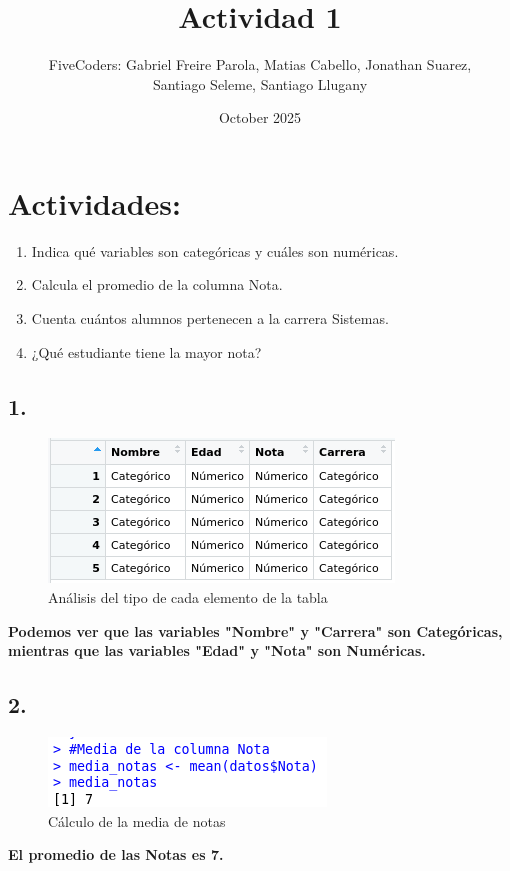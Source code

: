\documentclass{article}
\title{Actividad 1}
\author{FiveCoders: Gabriel Freire Parola, Matias Cabello, Jonathan Suarez, \\ Santiago Seleme, Santiago Llugany }
\date{October 2025}
\begin{document}
\maketitle

\section*{Actividades:}
\begin{enumerate}
    \item  Indica qué variables son categóricas y cuáles son numéricas.
    \item Calcula el promedio de la columna Nota.
    \item Cuenta cuántos alumnos pertenecen a la carrera Sistemas.
    \item ¿Qué estudiante tiene la mayor nota?
\end{enumerate}

\subsection*{1.}
\begin{figure}[H]
    \centering
    \includegraphics[width=1\linewidth]{Captura desde 2025-10-07 19-13-27.png}
    \caption{Análisis del tipo de cada elemento de la tabla}
    \label{fig:placeholder}
\end{figure}
\textbf{Podemos ver que las variables "Nombre" y "Carrera" son Categóricas, mientras que las variables "Edad" y "Nota" son Numéricas. }
\\
\subsection*{2.}
\begin{figure}[H]
    \centering
    \includegraphics[width=1\linewidth]{Captura desde 2025-10-07 19-22-15.png}
    \caption{Cálculo de la media de notas}
    \label{fig:placeholder}
\end{figure}
\textbf{El promedio de las Notas es 7.}
\end{document}

